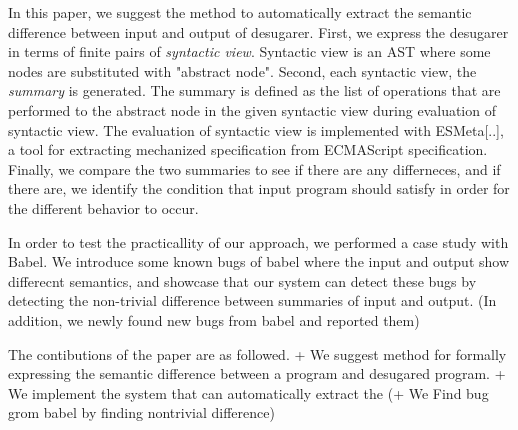 In this paper, we suggest the method to automatically extract the semantic difference between input and output of desugarer.
First, we express the desugarer in terms of finite pairs of \textit{syntactic view}. Syntactic view is an AST where some nodes are
substituted with "abstract node".
Second, each syntactic view, the \textit{summary} is generated. The summary is defined as the list of
operations that are performed to the abstract node in the given syntactic view during evaluation of syntactic view.
The evaluation of syntactic view is implemented with ESMeta[..], a tool for extracting mechanized specification from ECMAScript specification.
Finally, we compare the two summaries to see if there are any differneces,
and if there are, we identify the condition that input program should satisfy in order for the different behavior to occur.

In order to test the practicallity of our approach, we performed a case study with Babel.
We introduce some known bugs of babel where the input and output show differecnt semantics,
and showcase that our system can detect these bugs by detecting the non-trivial difference between summaries of input and output.
(In addition, we newly found new bugs from babel and reported them)

The contibutions of the paper are as followed.
  + We suggest method for formally expressing the semantic difference between a program and desugared program.
  + We implement the system that can automatically extract the 
  (+ We Find bug grom babel by finding nontrivial difference)
